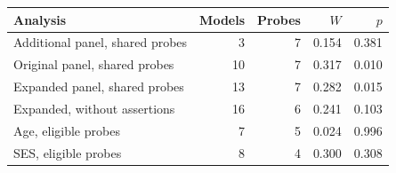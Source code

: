 \begin{tabular}{lrrrr}
\toprule
Analysis & Models & Probes & $W$ & $p$ \\
\midrule
Additional panel, shared probes & 3 & 7 & 0.154 & 0.381 \\
Original panel, shared probes & 10 & 7 & 0.317 & 0.010 \\
Expanded panel, shared probes & 13 & 7 & 0.282 & 0.015 \\
Expanded, without assertions & 16 & 6 & 0.241 & 0.103 \\
Age, eligible probes & 7 & 5 & 0.024 & 0.996 \\
SES, eligible probes & 8 & 4 & 0.300 & 0.308 \\
\bottomrule
\end{tabular}
